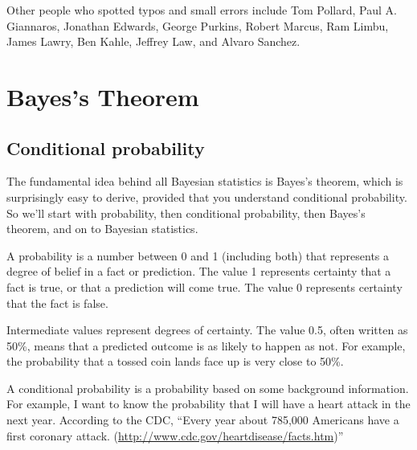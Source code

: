 \documentclass[12pt]{book}
\begin{document}
Other people who spotted typos and small errors include
Tom Pollard,
Paul A. Giannaros,
Jonathan Edwards,
George Purkins,
Robert Marcus,
Ram Limbu,
James Lawry,
Ben Kahle,
Jeffrey Law, and
Alvaro Sanchez.

\normalsize

\clearemptydoublepage

\begin{latexonly}

\tableofcontents

\clearemptydoublepage

\end{latexonly}

\mainmatter

\newcommand{\p}[1]{\ensuremath{\mathrm{p}(#1)}}
\newcommand{\odds}[1]{\ensuremath{\mathrm{o}(#1)}}
\newcommand{\T}[1]{\mbox{#1}}
\newcommand{\AND}{~\mathrm{and}~}
\newcommand{\NOT}{\mathrm{not}~}


\chapter{Bayes's Theorem}
\label{intro}

\section{Conditional probability}

The fundamental idea behind all Bayesian statistics is Bayes's theorem,
which is surprisingly easy to derive, provided that you understand
conditional probability.  So we'll start with probability, then
conditional probability, then Bayes's theorem, and on to Bayesian
statistics.

A probability is a number between 0 and 1 (including both) that
represents a degree of belief in a fact or prediction.  The value
1 represents certainty that a fact is true, or that a prediction
will come true.  The value 0 represents certainty
that the fact is false.

Intermediate values represent degrees of certainty.  The value 0.5,
often written as 50\%, means that a predicted outcome is
as likely to happen as not.  For example, the probability that a tossed
coin lands face up is very close to 50\%.

A conditional probability is a probability based on some background
information.  For example, I want to know the probability
that I will have a heart attack in the next year.  According to the
CDC, ``Every year about 785,000 Americans have a first coronary attack.
(\url{http://www.cdc.gov/heartdisease/facts.htm})''
\end{document}
